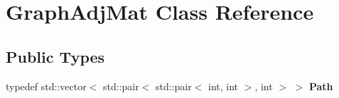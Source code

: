 \hypertarget{classGraphAdjMat}{
\section{GraphAdjMat Class Reference}
\label{classGraphAdjMat}
}
\subsection*{Public Types}
\begin{DoxyCompactItemize}
\item 
\hypertarget{classGraphAdjMat_a88a0f99f3fd4d00d4ef6e7702b0e59f2}{
typedef std::vector$<$ std::pair$<$ std::pair$<$ int, int $>$, int $>$ $>$ {\bfseries Path}}
\label{classGraphAdjMat_a88a0f99f3fd4d00d4ef6e7702b0e59f2}

\end{DoxyCompactItemize}
